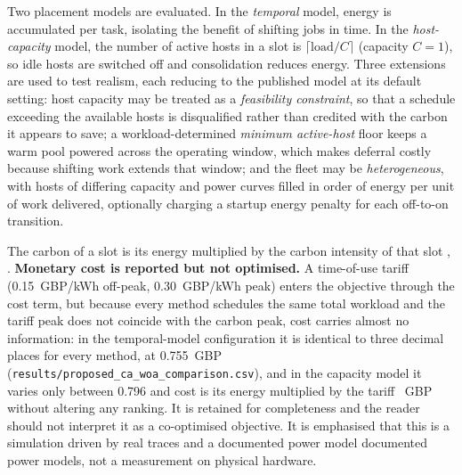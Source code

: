 \documentclass[12pt,a4paper]{article}
\providecommand{\DIFaddtex}[1]{{\protect\color{blue} \sf #1}} %
\providecommand{\DIFdeltex}[1]{{\protect\color{red} \scriptsize #1}} %
\providecommand{\DIFaddbegin}{} %
\providecommand{\DIFaddend}{} %
\providecommand{\DIFdelbegin}{} %
\providecommand{\DIFdelend}{} %
\providecommand{\DIFadd}[1]{\texorpdfstring{\DIFaddtex{#1}}{#1}} %
\providecommand{\DIFdel}[1]{\texorpdfstring{\DIFdeltex{#1}}{}} %
\providecommand{\DIFscaledelfig}{0.5}
\newlength{\DIFdelgraphicswidth} %
\newlength{\DIFdelgraphicsheight} %
\providecommand{\DIFaddincludegraphics}[2][]{{\color{blue}\fbox{\DIFOincludegraphics[#1]{#2}}}} %
\providecommand{\DIFdelincludegraphics}[2][]{%
\sbox{\DIFdelgraphicsbox}{\DIFOincludegraphics[#1]{#2}}%
\settoboxwidth{\DIFdelgraphicswidth}{\DIFdelgraphicsbox} %
\settoboxtotalheight{\DIFdelgraphicsheight}{\DIFdelgraphicsbox} %
\scalebox{\DIFscaledelfig}{%
\parbox[b]{\DIFdelgraphicswidth}{\usebox{\DIFdelgraphicsbox}\\[-\baselineskip] \rule{\DIFdelgraphicswidth}{0em}}\llap{\resizebox{\DIFdelgraphicswidth}{\DIFdelgraphicsheight}{%
\setlength{\unitlength}{\DIFdelgraphicswidth}%
\begin{picture}(1,1)%
\thicklines\linethickness{2pt} %
{\color[rgb]{1,0,0}\put(0,0){\framebox(1,1){}}}%
{\color[rgb]{1,0,0}\put(0,0){\line( 1,1){1}}}%
{\color[rgb]{1,0,0}\put(0,1){\line(1,-1){1}}}%
\end{picture}%
}\hspace*{3pt}}} %
} %
\DeclareRobustCommand{\DIFaddbegin}{\DIFOaddbegin \let\includegraphics\DIFaddincludegraphics} %
\DeclareRobustCommand{\DIFaddend}{\DIFOaddend \let\includegraphics\DIFOincludegraphics} %
\DeclareRobustCommand{\DIFdelbegin}{\DIFOdelbegin \let\includegraphics\DIFdelincludegraphics} %
\DeclareRobustCommand{\DIFdelend}{\DIFOaddend \let\includegraphics\DIFOincludegraphics} %
\begin{document}
\DIFadd{Two placement }\DIFaddend models are evaluated. In the \emph{temporal} model, energy is accumulated per task, isolating
the benefit of shifting jobs in time. In the \emph{host-capacity} model, the number of active hosts in a slot
is $\lceil \text{load}/C \rceil$ (capacity $C=1$), so idle hosts are switched off and consolidation reduces
energy. \DIFaddbegin \DIFadd{Three extensions are used to test realism, each reducing to the published model at its default
setting: host capacity may be treated as a \emph{feasibility constraint}, so that a schedule exceeding the
available hosts is disqualified rather than credited with the carbon it appears to save; a
workload-determined \emph{minimum active-host} floor keeps a warm pool powered across the operating window,
which makes deferral costly because shifting work extends that window; and the fleet may be
\emph{heterogeneous}, with hosts of differing capacity and power curves filled in order of energy per unit of
work delivered, optionally charging a startup energy penalty for each off-to-on transition.
}

\DIFaddend The carbon of a slot is its energy multiplied by the carbon intensity of that slot\DIFdelbegin \DIFdel{, }\DIFdelend \DIFaddbegin \DIFadd{. \textbf{Monetary cost is
reported but not optimised.} A time-of-use tariff (0.15~GBP/kWh off-peak, 0.30~GBP/kWh peak) enters the
objective through the cost term, but because every method schedules the same total workload and the tariff
peak does not coincide with the carbon peak, cost carries almost no information: in the temporal-model
configuration it is identical to three decimal places for every method, at 0.755~GBP
(\texttt{results/proposed\_ca\_woa\_comparison.csv}), and in the capacity model it varies only between 0.796
}\DIFaddend and \DIFdelbegin \DIFdel{cost is its energy multiplied by the tariff}\DIFdelend \DIFaddbegin \DIFadd{0.935~GBP without altering any ranking}\DIFaddend . It is \DIFaddbegin \DIFadd{retained for
completeness and the reader should not interpret it as a co-optimised objective. It is }\DIFaddend emphasised that this is
a simulation driven by real traces and \DIFdelbegin \DIFdel{a documented power model}\DIFdelend \DIFaddbegin \DIFadd{documented power models}\DIFaddend , not a measurement on physical hardware.
\end{document}
